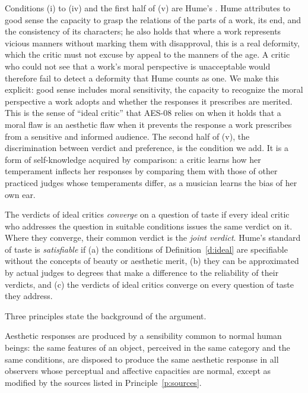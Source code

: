 \documentclass{situationist-preprint}
\begin{document}
Conditions (i) to (iv) and the first half of (v) are Hume's \citep{Hume1757}. Hume attributes to good sense the capacity to grasp the relations of the parts of a work, its end, and the consistency of its characters; he also holds that where a work represents vicious manners without marking them with disapproval, this is a real deformity, which the critic must not excuse by appeal to the manners of the age. A critic who could not see that a work's moral perspective is unacceptable would therefore fail to detect a deformity that Hume counts as one. We make this explicit: good sense includes moral sensitivity, the capacity to recognize the moral perspective a work adopts and whether the responses it prescribes are merited. This is the sense of \enquote{ideal critic} that AES-08 relies on when it holds that a moral flaw is an aesthetic flaw when it prevents the response a work prescribes from a sensitive and informed audience. The second half of (v), the discrimination between verdict and preference, is the condition we add. It is a form of self-knowledge acquired by comparison: a critic learns how her temperament inflects her responses by comparing them with those of other practiced judges whose temperaments differ, as a musician learns the bias of her own ear.

\begin{definition}\label{d:conv}
The verdicts of ideal critics \emph{converge} on a question of taste if every ideal critic who addresses the question in suitable conditions issues the same verdict on it. Where they converge, their common verdict is the \emph{joint verdict}. Hume's standard of taste is \emph{satisfiable} if (a) the conditions of Definition~\ref{d:ideal} are specifiable without the concepts of beauty or aesthetic merit, (b) they can be approximated by actual judges to degrees that make a difference to the reliability of their verdicts, and (c) the verdicts of ideal critics converge on every question of taste they address.
\end{definition}

Three principles state the background of the argument.

\begin{principle}\label{p:common}
Aesthetic responses are produced by a sensibility common to normal human beings: the same features of an object, perceived in the same category and the same conditions, are disposed to produce the same aesthetic response in all observers whose perceptual and affective capacities are normal, except as modified by the sources listed in Principle~\ref{p:sources}.
\end{principle}
\end{document}
